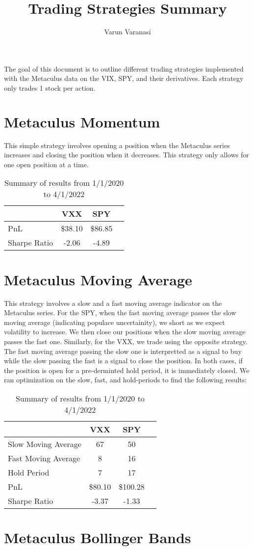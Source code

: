 \documentclass{article}
\title{Trading Strategies Summary}
\author{Varun Varanasi}
\begin{document}
\maketitle

The goal of this document is to outline different trading strategies implemented with the Metaculus data on the VIX, SPY, and their derivatives. Each strategy only trades 1 stock per action. 

\section*{Metaculus Momentum}
This simple strategy involves opening a position when the Metaculus series increases and closing the position when it decreases. This strategy only allows for one open position at a time.

\begin{table}[h]
\centering

\begin{tabular}{l||ccc}
    \toprule
     & \textbf{VXX} & \textbf{SPY} & \\
    \midrule
    PnL & \$38.10 & \$86.85 \\
    Sharpe Ratio & -2.06 & -4.89\\
    \bottomrule
\end{tabular}
\caption{Summary of results from 1/1/2020 to 4/1/2022}
\end{table}

\section*{Metaculus Moving Average}
This strategy involves a slow and a fast moving average indicator on the Metaculus series. For the SPY, when the fast moving average passes the slow moving average (indicating populace uncertainity), we short as we expect volatility to increase. We then close our positions when the slow moving average passes the fast one.
Similarly, for the VXX, we trade using the opposite strategy. The fast moving average passing the slow one is interpretted as a signal to buy while the slow passing the fast is a signal to close the position. In both cases, if the position is open for a pre-derminted hold period, it is immediately closed. We ran optimization on the slow, fast, and hold-periods to find the following results:

\begin{table}[h]
    \centering
    
    \begin{tabular}{l||ccc}
        \toprule
         & \textbf{VXX} & \textbf{SPY} & \\
        \midrule
        Slow Moving Average & 67  & 50\\
        Fast Moving Average & 8  & 16\\
        Hold Period & 7  & 17\\
        PnL & \$80.10 & \$100.28 \\
        Sharpe Ratio & -3.37 & -1.33\\
        \bottomrule
    \end{tabular}
    \caption{Summary of results from 1/1/2020 to 4/1/2022}
    \end{table}

\section*{Metaculus Bollinger Bands}
\end{document}
